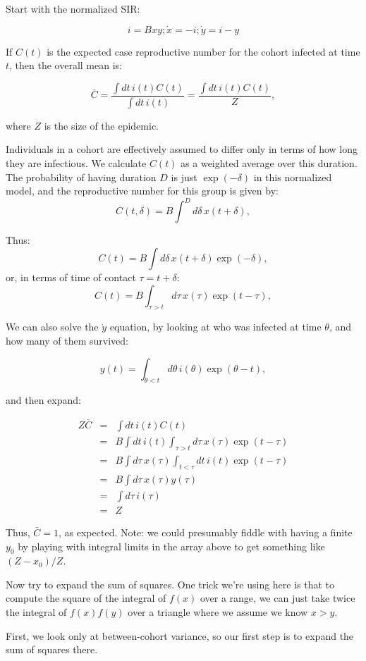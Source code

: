 \documentclass[12pt]{article}
\begin{document}
Start with the normalized SIR:

$$ i = Bxy; \dot x = -i; \dot y = i-y $$

If $C(t)$ is the expected case reproductive number for the cohort infected at time $t$, then the overall mean is:

$$
	\bar C
	= \frac{\int{dt\, i(t) C(t)}}{\int{dt\, i(t)}}
	= \frac{\int{dt\, i(t) C(t)}}{Z},
$$

where $Z$ is the size of the epidemic.

Individuals in a cohort are effectively assumed to differ only in terms of how long they are infectious. We calculate $C(t)$ as a weighted average over this duration. The probability of having duration $D$ is just $\exp(-\delta)$ in this normalized model, and the reproductive number for this group is given by:
$$C(t, \delta) = B \int^D{d\delta\, x(t+\delta)}, $$

Thus:
$$C(t) = B \int{d\delta\, x(t+\delta) \exp(-\delta)}, $$
or, in terms of time of contact $\tau=t+\delta$:
$$C(t) = B \int_{\tau>t}{d\tau\, x(\tau) \exp(t-\tau)}, $$

We can also solve the $\dot y$ equation, by looking at who was infected at time $\theta$, and how many of them survived:

$$ y(t) = \int_{\theta<t}{d\theta\, i(\theta)\exp(\theta-t)},$$

and then expand:

\begin{eqnarray}
	Z \bar C
	&=& \int{dt\, i(t) C(t)}
	\\ &=& B \int{dt\, i(t) \int_{\tau>t}{d\tau\, x(\tau) \exp(t-\tau)}}
	\\ &=& B \int{d\tau\, x(\tau) \int_{t<\tau}dt\, i(t) \exp(t-\tau)}
	\\ &=& B \int{d\tau\, x(\tau) y(\tau)}
	\\ &=& \int{d\tau\, i(\tau)}
	\\ &=& Z
\end{eqnarray}

Thus, $\bar C = 1$, as expected. Note: we could presumably fiddle with having a finite $y_0$ by playing with integral limits in the array above to get something like $(Z-x_0)/Z$.

Now try to expand the sum of squares. One trick we're using here is that to compute the square of the integral of $f(x)$ over a range, we can just take twice the integral of $f(x)f(y)$ over a triangle where we assume we know $x>y$.

First, we look only at between-cohort variance, so our first step is to expand the sum of squares there.
\end{document}
